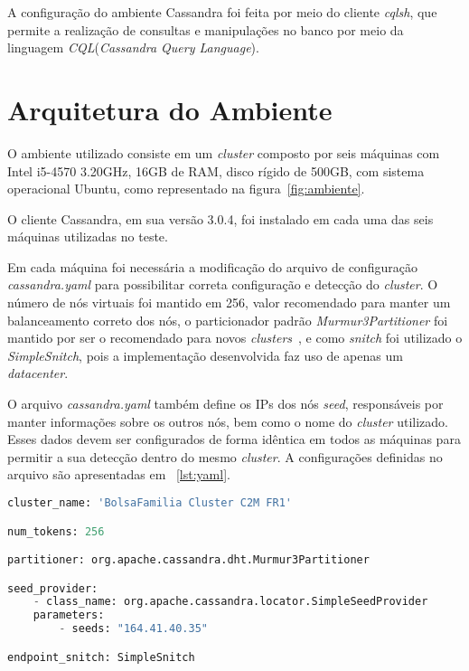
A configuração do ambiente Cassandra foi feita por meio do cliente \emph{cqlsh}, que permite a realização de consultas e manipulações no banco por meio da linguagem \emph{CQL}(\emph{Cassandra Query Language}).

\section{Arquitetura do Ambiente}
O ambiente utilizado consiste em um \emph{cluster} composto por seis máquinas com Intel i5-4570 3.20GHz, 16GB de RAM, disco rígido de 500GB, com sistema operacional Ubuntu, como representado na figura~\ref{fig:ambiente}.


O cliente Cassandra, em sua versão 3.0.4, foi instalado em cada uma das seis máquinas utilizadas no teste.

Em cada máquina foi necessária a modificação do arquivo de configuração \emph{cassandra.yaml} para possibilitar correta configuração e detecção do \emph{cluster}. O número de nós virtuais foi mantido em 256, valor recomendado para manter um balanceamento correto dos nós, o particionador padrão \emph{Murmur3Partitioner} foi mantido por ser o recomendado para novos \emph{clusters}~\cite{cassandrapartitioners}, e como \emph{snitch} foi utilizado o \emph{SimpleSnitch}, pois a implementação desenvolvida faz uso de apenas um \emph{datacenter}. 

O arquivo \emph{cassandra.yaml} também define os IPs dos nós \emph{seed}, responsáveis por manter informações sobre os outros nós, bem como o nome do \emph{cluster} utilizado. Esses dados devem ser configurados de forma idêntica em todos as máquinas para permitir a sua detecção dentro do mesmo \emph{cluster}. A configurações definidas no arquivo são apresentadas em ~\ref{lst:yaml}.

\begin{lstlisting}[caption={Configuração cassandra.yaml},label={lst:yaml},language=python]
cluster_name: 'BolsaFamilia Cluster C2M FR1'

num_tokens: 256

partitioner: org.apache.cassandra.dht.Murmur3Partitioner

seed_provider:
	- class_name: org.apache.cassandra.locator.SimpleSeedProvider
	parameters:
		- seeds: "164.41.40.35"

endpoint_snitch: SimpleSnitch

\end{lstlisting}

